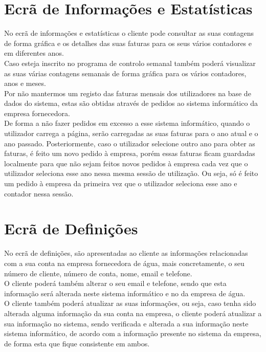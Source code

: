 \section{Ecrã de Informações e Estatísticas} \label{ecra:info} %
No ecrã de informações e estatísticas o cliente pode consultar as suas contagens de forma gráfica e os detalhes das suas faturas para os seus vários contadores e em diferentes anos.\\
Caso esteja inscrito no programa de controlo semanal também poderá visualizar as suas várias contagens semanais de forma gráfica para os vários contadores, anos e meses.\\
Por não mantermos um registo das faturas mensais dos utilizadores na base de dados do sistema, estas são obtidas através de pedidos ao sistema informático da empresa fornecedora.\\
De forma a não fazer pedidos em excesso a esse sistema informático, quando o utilizador carrega a página, serão carregadas as suas faturas para o ano atual e o ano passado. Posteriormente, caso o utilizador selecione outro ano para obter as faturas, é feito um novo pedido à empresa, porém essas faturas ficam guardadas localmente para que não sejam feitos novos pedidos à empresa cada vez que o utilizador seleciona esse ano nessa mesma sessão de utilização. Ou seja, só é feito um pedido à empresa da primeira vez que o utilizador seleciona esse ano e contador nessa sessão.\\

\section{Ecrã de Definições} \label{ecra:def} %
No ecrã de definições, são apresentadas ao cliente as informações relacionadas com a sua conta na empresa fornecedora de água, mais concretamente, o seu número de cliente, número de conta, nome, email e telefone.\\
O cliente poderá também alterar o seu email e telefone, sendo que esta informação será alterada neste sistema informático e no da empresa de água.\\
O cliente também poderá atualizar as suas informações, ou seja, caso tenha sido alterada alguma informação da sua conta na empresa, o cliente poderá atualizar a sua informação no sistema, sendo verificada e alterada a sua informação neste sistema informático, de acordo com a informação presente no sistema da empresa, de forma esta que fique consistente em ambos.


